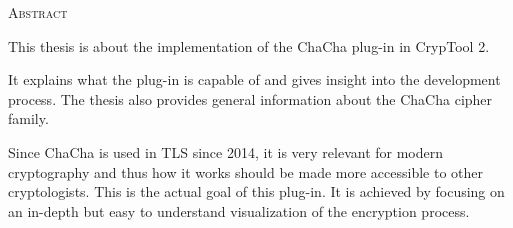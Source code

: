 
\begin{center}
  \textsc{Abstract}
\end{center}

\noindent
This thesis is about the implementation of the ChaCha plug-in in CrypTool 2.

\medskip
\noindent
It explains what the plug-in is capable of and gives insight into the development process. The thesis also provides general information about the ChaCha cipher family.

\medskip
\noindent
Since ChaCha is used in TLS since 2014, it is very relevant for modern cryptography and thus how it works should be made more accessible to other cryptologists. This is the actual goal of this plug-in. It is achieved by focusing on an in-depth but easy to understand visualization of the encryption process.

